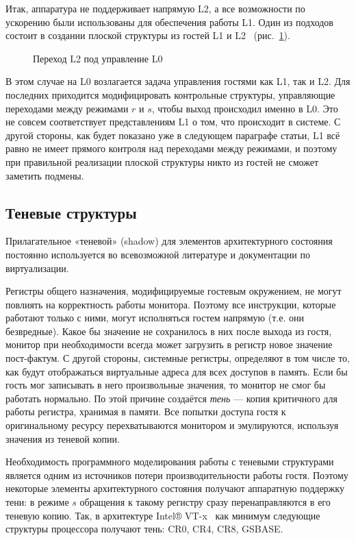 Итак, аппаратура не поддерживает напрямую L2, а все возможности по ускорению были использованы для обеспечения работы L1. Один из подходов состоит в создании плоской структуры из гостей L1 и L2~\cite{turtles} (рис.~\ref{fig:nested-virt-flat}).

\begin{figure}[htb]
    \centering
    \caption[Переход L2 под управление L0]{Переход L2 под управление L0}
    \label{fig:nested-virt-flat}
\end{figure}

В этом случае на L0 возлагается задача управления гостями как L1, так и L2. Для последних приходится модифицировать контрольные структуры, управляющие переходами между режимами $r$ и $s$, чтобы выход происходил именно в L0. Это не совсем соответствует представлениям L1 о том, что происходит в системе. С другой стороны, как будет показано уже в следующем параграфе статьи, L1 всё равно не имеет прямого контроля над переходами между режимами, и поэтому при правильной реализации плоской структуры никто из гостей не сможет заметить подмены.

\subsection{Теневые структуры}

Прилагательное «теневой» (\abbr shadow) для элементов архитектурного состояния постоянно используется во всевозможной литературе и документации по виртуализации.

Регистры общего назначения, модифицируемые гостевым окружением, не могут повлиять на корректность работы монитора. Поэтому все инструкции, которые работают только с ними, могут исполняться гостем напрямую (т.е. они безвредные). Какое бы значение не сохранилось в них после выхода из гостя, монитор при необходимости всегда может загрузить в регистр новое значение пост-фактум. С другой стороны, системные регистры, определяют в том числе то, как будут отображаться виртуальные адреса для всех доступов в память. Если бы гость мог записывать в него произвольные значения, то монитор не смог бы работать нормально. По этой причине создаётся \textit{тень} — копия критичного для работы регистра, хранимая в памяти. Все попытки доступа гостя к оригинальному ресурсу перехватываются монитором и эмулируются, используя значения из теневой копии.

Необходимость программного моделирования работы с теневыми структурами является одним из источников потери производительности работы гостя. Поэтому некоторые элементы архитектурного состояния получают аппаратную поддержку тени: в режиме $s$ обращения к такому регистру сразу перенаправляются в его теневую копию.
Так, в архитектуре Intel® VT-x \cite{vtx} как минимум следующие структуры процессора получают тень: CR0, CR4, CR8, GSBASE.

